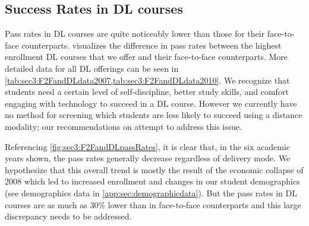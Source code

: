 \subsection{Success Rates in DL courses}
Pass rates in DL courses are quite noticeably lower than those for their
face-to-face counterparts.  visualizes the
difference in pass rates between the highest enrollment DL courses that we offer
and their face-to-face counterparts. More detailed data for all DL offerings can
be seen in \cref{tab:sec3:F2FandDLdata2007,tab:sec3:F2FandDLdata2010}. We recognize that students need a
certain level of self-discipline, better study skills, and comfort engaging with
technology to succeed in a DL course. However we currently have no method for
screening which students are less likely to succeed using a distance modality;
our recommendations on  attempt to address this issue.

Referencing \cref{fig:sec3:F2FandDLpassRates}, 
it is clear that, in the six academic years shown, the pass rates 
generally decrease regardless of delivery mode.  We hypothesize that this
overall trend is mostly the result of the economic collapse of 2008 which led to
increased enrollment and changes in our student demographics (see demographics
data in \vref{app:sec:demographicdata}).  But the pass rates in DL courses are
as much as 30\% lower than in face-to-face counterparts and this large
discrepancy needs to be addressed.

